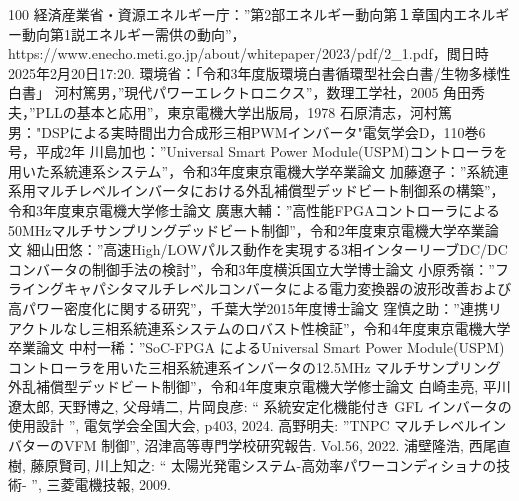 \begin{thebibliography}{100}
経済産業省・資源エネルギー庁：”第2部エネルギー動向第１章国内エネルギー動向第1説エネルギー需供の動向”，\\https://www.enecho.meti.go.jp/about/whitepaper/2023/pdf/2\_1.pdf，閲日時2025年2月20日17:20.
環境省：「令和3年度版環境白書循環型社会白書/生物多様性白書」
河村篤男，”現代パワーエレクトロニクス”，数理工学社，2005
角田秀夫，”PLLの基本と応用”，東京電機大学出版局，1978
石原清志，河村篤男："DSPによる実時間出力合成形三相PWMインバータ"電気学会D，110巻6号，平成2年
川島加也：”Universal Smart Power Module(USPM)コントローラを用いた系統連系システム”，令和3年度東京電機大学卒業論文
加藤遼子：”系統連系用マルチレベルインバータにおける外乱補償型デッドビート制御系の構築”，令和3年度東京電機大学修士論文
廣惠大輔：”高性能FPGAコントローラによる50MHzマルチサンプリングデッドビート制御”，令和2年度東京電機大学卒業論文
細山田悠：”高速High/LOWパルス動作を実現する3相インターリーブDC/DCコンバータの制御手法の検討”，令和3年度横浜国立大学博士論文
小原秀嶺：”フライングキャパシタマルチレベルコンバータによる電力変換器の波形改善および高パワー密度化に関する研究”，千葉大学2015年度博士論文
窪慎之助：”連携リアクトルなし三相系統連系システムのロバスト性検証”，令和4年度東京電機大学卒業論文
中村一稀：”SoC-FPGA によるUniversal Smart Power Module(USPM)コントローラを用いた三相系統連系インバータの12.5MHz マルチサンプリング外乱補償型デッドビート制御”，令和4年度東京電機大学修士論文
白崎圭亮, 平川遼太郎, 天野博之, 父母靖二, 片岡良彦: “ 系統安定化機能付き GFL インバータの使用設計 ”, 電気学会全国大会, p403, 2024.
高野明夫: ”TNPC マルチレベルインバターのVFM 制御”, 沼津高等専門学校研究報告. Vol.56, 2022.
浦壁隆浩, 西尾直樹, 藤原賢司, 川上知之: “ 太陽光発電システム-高効率パワーコンディショナの技術- ”, 三菱電機技報, 2009.
\end{thebibliography}